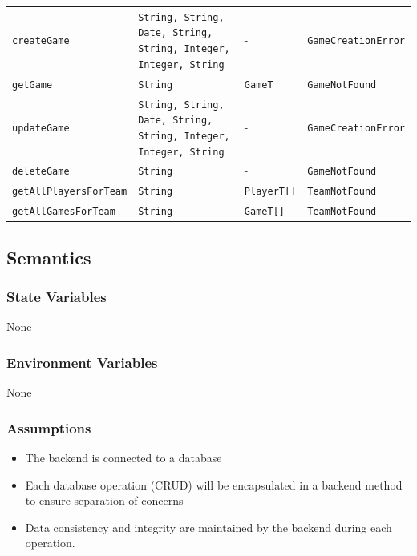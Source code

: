 \documentclass[12pt, titlepage]{article}
\begin{document}
\begin{center}
\begin{tabular}{p{4cm} p{4cm} p{4cm} p{4cm}}
    \texttt{createGame}           & \texttt{String, String, Date, String, String, Integer, Integer, String} & -                  & \texttt{GameCreationError}   \\
    \texttt{getGame}              & \texttt{String}                                                         & \texttt{GameT}     & \texttt{GameNotFound}        \\
    \texttt{updateGame}           & \texttt{String, String, Date, String, String, Integer, Integer, String} & -                  & \texttt{GameCreationError}   \\
    \texttt{deleteGame}           & \texttt{String}                                                         & -                  & \texttt{GameNotFound}        \\
    \texttt{getAllPlayersForTeam} & \texttt{String}                                                         & \texttt{PlayerT[]} & \texttt{TeamNotFound}        \\
    \texttt{getAllGamesForTeam}   & \texttt{String}                                                         & \texttt{GameT[]}   & \texttt{TeamNotFound}        \\
    \bottomrule
  \end{tabular}
\end{center}


\subsection{Semantics}

\subsubsection{State Variables}
None

\subsubsection{Environment Variables}
None

\subsubsection{Assumptions}

\begin{itemize}
  \item The backend is connected to a database
  \item Each database operation (CRUD) will be encapsulated in a backend method to ensure separation of concerns
  \item Data consistency and integrity are maintained by the backend during each operation.
\end{itemize}
\end{document}
